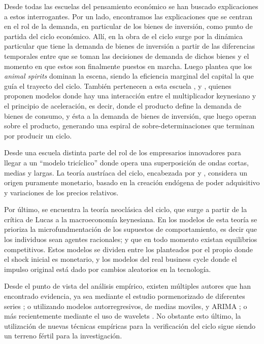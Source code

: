 \documentclass[a4paper]{article}
\begin{document}
Desde todas las escuelas del pensamiento económico se han buscado explicaciones a estos interrogantes. Por un lado, encontramos las explicaciones que se centran en el rol de la demanda, en particular de los bienes de inversión, como punto de partida del ciclo económico. Allí, en la obra de \cite{kalecki2013essays} el ciclo surge por la dinámica particular que tiene la demanda de bienes de inversión a partir de las diferencias temporales entre que se toman las decisiones de demanda de dichos bienes y el momento en que estos son finalmente puestos en marcha. Luego \cite{keynes2018general} plantea que los \textit{animal spirits} dominan la escena, siendo la eficiencia marginal del capital la que guía el trayecto del ciclo. También pertenecen a esta escuela \cite{harrod1936trade}, \cite{kaldor1940model} y \cite{samuelson1939synthesis}, quienes proponen modelos donde hay una interacción entre el multiplicador keynesiano y el principio de aceleración, es decir, donde el producto define la demanda de bienes de consumo, y ésta a la demanda de bienes de inversión, que luego operan sobre el producto, generando una espiral de sobre-determinaciones que terminan por producir un ciclo. 

Desde una escuela distinta \cite{schumpeter1939business} parte del rol de los empresarios innovadores para llegar a un “modelo tricíclico” donde opera una superposición de ondas cortas, medias y largas. 
La teoría austríaca del ciclo, encabezada por \cite{hayek1933} y \cite{von1943elastic}, considera un origen puramente monetario, basado en la creación endógena de poder adquisitivo y variaciones de los precios relativos. 

Por último, se encuentra la teoría neoclásica del ciclo, que surge a partir de la crítica de Lucas a la macroeconomía keynesiana. En los modelos de esta teoría se prioriza la microfundmentación de los supuestos de comportamiento, es decir que los individuos sean agentes racionales; y que en todo momento existan equilibrios competitivos. Estos modelos se dividen entre los planteados por el propio \cite{lucas1975equilibrium} donde el shock inicial es monetario, y los modelos del real business cycle \citep{plosser1989understanding} donde el impulso original está dado por cambios aleatorios en la tecnología.

Desde el punto de vista del análisis empírico, existen múltiples autores que han encontrado evidencia, ya sea mediante el estudio pormenorizado de diferentes series  \citep{kuznets1930secular,kondratieff1979long,schumpeter1939business}; o utilizando  modelos autorregresivos, de medias moviles, y ARIMA \citep{hamilton1989new,kaiser2012measuring}; o más recientemente mediante el uso de wavelets \citep{yogo2008measuring,soares2011business}. No obstante esto último, la utilización de nuevas técnicas empíricas para la verificación del ciclo sigue siendo un terreno fértil para la investigación.
\end{document}
